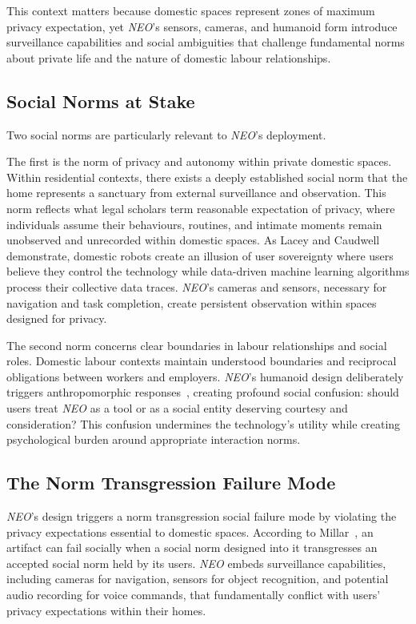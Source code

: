 \documentclass{ieee-portfolio}
\newcommand{\neo}{\textit{NEO}}
\begin{document}
This context matters because domestic spaces represent zones of maximum privacy expectation, yet \neo{}'s sensors, cameras, and humanoid form introduce surveillance capabilities and social ambiguities that challenge fundamental norms about private life and the nature of domestic labour relationships.

\subsection{Social Norms at Stake}

Two social norms are particularly relevant to \neo{}'s deployment.

The first is the norm of privacy and autonomy within private domestic spaces. Within residential contexts, there exists a deeply established social norm that the home represents a sanctuary from external surveillance and observation. This norm reflects what legal scholars term reasonable expectation of privacy, where individuals assume their behaviours, routines, and intimate moments remain unobserved and unrecorded within domestic spaces. As Lacey and Caudwell~\cite{lacey_cuteness_2019} demonstrate, domestic robots create an illusion of user sovereignty where users believe they control the technology while data-driven machine learning algorithms process their collective data traces. \neo{}'s cameras and sensors, necessary for navigation and task completion, create persistent observation within spaces designed for privacy.

The second norm concerns clear boundaries in labour relationships and social roles. Domestic labour contexts maintain understood boundaries and reciprocal obligations between workers and employers. \neo{}'s humanoid design deliberately triggers anthropomorphic responses~\cite{darling_whos_2015}, creating profound social confusion: should users treat \neo{} as a tool or as a social entity deserving courtesy and consideration? This confusion undermines the technology's utility while creating psychological burden around appropriate interaction norms.

\subsection{The Norm Transgression Failure Mode}

\neo{}'s design triggers a norm transgression social failure mode by violating the privacy expectations essential to domestic spaces. According to Millar~\cite{millar_social_2020}, an artifact can fail socially when a social norm designed into it transgresses an accepted social norm held by its users. \neo{} embeds surveillance capabilities, including cameras for navigation, sensors for object recognition, and potential audio recording for voice commands, that fundamentally conflict with users' privacy expectations within their homes.
\end{document}
